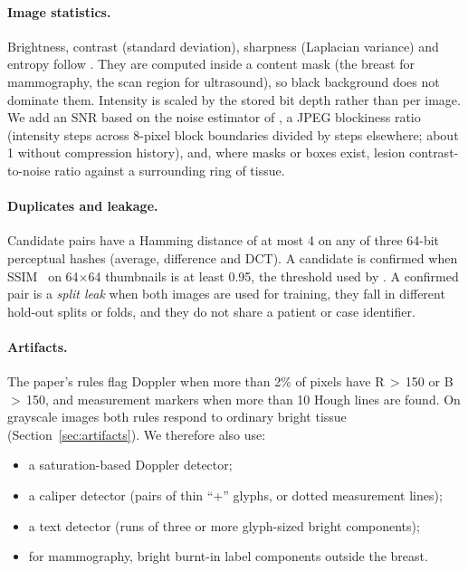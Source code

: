 \documentclass[11pt]{article}
\begin{document}
\paragraph{Image statistics.} Brightness, contrast (standard deviation),
sharpness (Laplacian variance) and entropy follow \citet{siddique2026audit}.
They are computed inside a content mask (the breast for mammography, the scan
region for ultrasound), so black background does not dominate them. Intensity
is scaled by the stored bit depth rather than per image. We add an
SNR based on the noise estimator of \citet{immerkaer1996noise}, a JPEG
blockiness ratio (intensity steps across 8-pixel block boundaries divided by
steps elsewhere; about 1 without compression history), and, where masks or
boxes exist, lesion contrast-to-noise ratio against a surrounding ring of
tissue.

\paragraph{Duplicates and leakage.} Candidate pairs have a Hamming distance
of at most 4 on any of three 64-bit perceptual hashes (average, difference and
DCT). A candidate is confirmed when SSIM~\citep{wang2004ssim} on 64$\times$64
thumbnails is at least 0.95, the threshold used by \citet{siddique2026audit}.
A confirmed pair is a \emph{split leak} when both images are used for training,
they fall in different hold-out splits or folds, and they do not share a
patient or case identifier.

\paragraph{Artifacts.} The paper's rules flag Doppler when more than 2\% of
pixels have R\,$>$\,150 or B\,$>$\,150, and measurement markers when more than
10 Hough lines are found. On grayscale images both rules respond to ordinary
bright tissue (Section~\ref{sec:artifacts}). We therefore also use:
\begin{itemize}
  \item a saturation-based Doppler detector;
  \item a caliper detector (pairs of thin ``+'' glyphs, or dotted measurement lines);
  \item a text detector (runs of three or more glyph-sized bright components);
  \item for mammography, bright burnt-in label components outside the breast.
\end{itemize}
\end{document}

